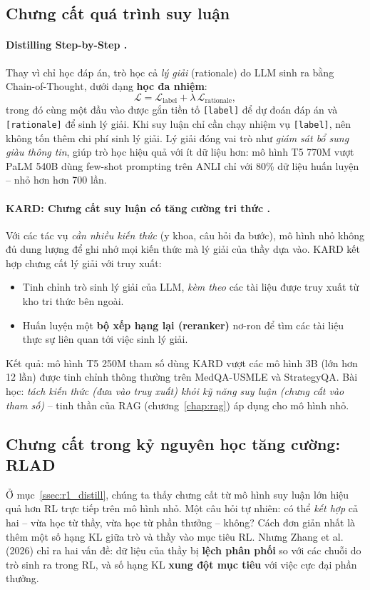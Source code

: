 \subsection{Chưng cất quá trình suy luận}
\label{ssec:rationale_distillation}

\paragraph{Distilling Step-by-Step \cite{hsieh2023distilling}.} Thay vì chỉ học đáp án, trò học cả \emph{lý giải} (rationale) do LLM sinh ra bằng Chain-of-Thought, dưới dạng \textbf{học đa nhiệm}:
\[
\mathcal{L} = \mathcal{L}_{\text{label}} + \lambda\, \mathcal{L}_{\text{rationale}},
\]
trong đó cùng một đầu vào được gắn tiền tố \texttt{[label]} để dự đoán đáp án và \texttt{[rationale]} để sinh lý giải. Khi suy luận chỉ cần chạy nhiệm vụ \texttt{[label]}, nên không tốn thêm chi phí sinh lý giải. Lý giải đóng vai trò như \emph{giám sát bổ sung giàu thông tin}, giúp trò học hiệu quả với ít dữ liệu hơn: mô hình T5 770M vượt PaLM 540B dùng few-shot prompting trên ANLI chỉ với 80\% dữ liệu huấn luyện -- nhỏ hơn hơn 700 lần.

\paragraph{KARD: Chưng cất suy luận có tăng cường tri thức \cite{kang2023kard}.} Với các tác vụ \emph{cần nhiều kiến thức} (y khoa, câu hỏi đa bước), mô hình nhỏ không đủ dung lượng để ghi nhớ mọi kiến thức mà lý giải của thầy dựa vào. KARD kết hợp chưng cất lý giải với truy xuất:
\begin{itemize}
	\item Tinh chỉnh trò sinh lý giải của LLM, \emph{kèm theo} các tài liệu được truy xuất từ kho tri thức bên ngoài.
	\item Huấn luyện một \textbf{bộ xếp hạng lại (reranker)} nơ-ron để tìm các tài liệu thực sự liên quan tới việc sinh lý giải.
\end{itemize}
Kết quả: mô hình T5 250M tham số dùng KARD vượt các mô hình 3B (lớn hơn 12 lần) được tinh chỉnh thông thường trên MedQA-USMLE và StrategyQA. Bài học: \emph{tách kiến thức (đưa vào truy xuất) khỏi kỹ năng suy luận (chưng cất vào tham số)} -- tinh thần của RAG (chương~\ref{chap:rag}) áp dụng cho mô hình nhỏ.

\subsection{Chưng cất trong kỷ nguyên học tăng cường: RLAD}
\label{ssec:rlad}
Ở mục~\ref{ssec:r1_distill}, chúng ta thấy chưng cất từ mô hình suy luận lớn hiệu quả hơn RL trực tiếp trên mô hình nhỏ. Một câu hỏi tự nhiên: có thể \emph{kết hợp} cả hai -- vừa học từ thầy, vừa học từ phần thưởng -- không? Cách đơn giản nhất là thêm một số hạng KL giữa trò và thầy vào mục tiêu RL. Nhưng Zhang et al. (2026) \cite{zhang2026rlad} chỉ ra hai vấn đề: dữ liệu của thầy bị \textbf{lệch phân phối} so với các chuỗi do trò sinh ra trong RL, và số hạng KL \textbf{xung đột mục tiêu} với việc cực đại phần thưởng.

